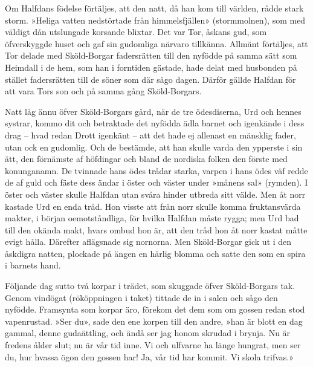 \protect\hypertarget{lb1625905.xhtmlux5cux23start93}{}{}\protect\hypertarget{lb1625905.xhtmlux5cux23start93-a}{}{}\protect\hypertarget{lb1625905.xhtmlux5cux23start93-b}{}{}\protect\hypertarget{lb1625905.xhtmlux5cux23start93-c}{}{}\protect\hypertarget{lb1625905.xhtmlux5cux23start93-d}{}{}

Om Halfdans födelse förtäljes, att den natt, då han kom till världen,
rådde stark storm. »Heliga vatten nedstörtade från himmelsfjällen»
(stormmolnen), som med väldigt dån utslungade korsande blixtar. Det var
Tor, åskans gud, som öfverskyggde huset och gaf sin gudomliga närvaro
tillkänna. Allmänt förtäljes, att Tor delade med Sköld-Borgar
fadersrätten till den nyfödde på samma sätt som Heimdall i de hem, som
han i forntiden gästade, hade delat med husbonden på stället
fadersrätten till de söner som där sågo dagen. Därför gällde Halfdan för
att vara Tors son och på samma gång Sköld-Borgars.

Natt låg ännu öfver Sköld-Borgars gård, när de tre ödesdiserna, Urd och
hennes systrar, kommo dit och betraktade det nyfödda ädla barnet och
igenkände i dess drag -- hvad redan Drott igenkänt -- att det hade ej
allenast en mänsklig fader, utan ock en gudomlig. Och de bestämde, att
han skulle varda den ypperste i sin ätt, den förnämste af höfdingar och
bland de nordiska folken den förste med konunganamn. De tvinnade hans
ödes trådar starka, varpen i hans ödes väf redde de af guld och fäste
dess ändar i öster och väster under »månens sal» (rymden). I öster och
väster skulle Halfdan utan svåra hinder utbreda sitt välde. Men åt norr
kastade Urd en enda tråd. Hon visste att från norr skulle komma
fruktansvärda makter, i början oemotståndliga, för hvilka Halfdan måste
rygga; men Urd bad till den okända makt, hvars ombud hon är, att den
tråd hon åt norr kastat måtte evigt hålla. Därefter aflägsnade sig
nornorna. Men Sköld-Borgar gick ut i den åskdigra natten, plockade på
ängen en härlig blomma och satte den som en spira i barnets hand.

Följande dag sutto två korpar i trädet, som skuggade öfver Sköld-Borgars
tak. Genom vindögat (rököppningen i taket) tittade de in i salen och
sågo den nyfödde. Framsynta som korpar äro, förekom det dem som om
gossen redan stod vapenrustad. »Ser du», sade den ene korpen till den
andre, »han är blott en dag gammal, denne gudaättling, och ändå ser jag
honom skrudad i brynja. Nu är fredens ålder slut;
\protect\hypertarget{lb1625905.xhtmlux5cux23start94}{}{}\protect\hypertarget{lb1625905.xhtmlux5cux23start94-a}{}{}\protect\hypertarget{lb1625905.xhtmlux5cux23start94-b}{}{}\protect\hypertarget{lb1625905.xhtmlux5cux23start94-c}{}{}\protect\hypertarget{lb1625905.xhtmlux5cux23start94-d}{}{}
nu är vår tid inne. Vi och ulfvarne ha länge hungrat, men ser du, hur
hvassa ögon den gossen har! Ja, vår tid har kommit. Vi skola trifvas.»

